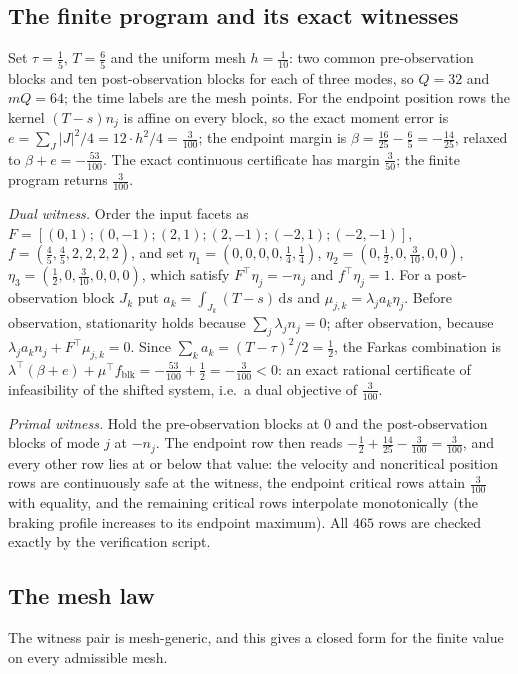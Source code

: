 \documentclass[11pt,a4paper]{article}
\theoremstyle{plain}
\theoremstyle{definition}
\theoremstyle{remark}
\newcommand{\tfr}[2]{\tfrac{#1}{#2}}
\newcommand{\dd}{\,\mathrm{d}}
\begin{document}
\subsection{The finite program and its exact witnesses}

Set $\tau=\tfr15$, $T=\tfr65$ and the uniform mesh $h=\tfr1{10}$: two common pre-observation blocks and ten post-observation blocks for each of three modes, so $Q=32$ and $mQ=64$; the time labels are the mesh points. For the endpoint position rows the kernel $(T-s)n_j$ is affine on every block, so the exact moment error is $e=\sum_J|J|^2/4=12\cdot h^2/4=\tfr3{100}$; the endpoint margin is $\beta=\tfr{16}{25}-\tfr65=-\tfr{14}{25}$, relaxed to $\beta+e=-\tfr{53}{100}$. The exact continuous certificate has margin $\tfr3{50}$; the finite program returns $\tfr3{100}$.

\emph{Dual witness.} Order the input facets as $F=[(0,1);(0,-1);(2,1);(2,-1);(-2,1);(-2,-1)]$, $f=(\tfr45,\tfr45,2,2,2,2)$, and set $\eta_1=(0,0,0,0,\tfr14,\tfr14)$, $\eta_2=(0,\tfr12,0,\tfr3{10},0,0)$, $\eta_3=(\tfr12,0,\tfr3{10},0,0,0)$, which satisfy $F^\top\eta_j=-n_j$ and $f^\top\eta_j=1$. For a post-observation block $J_k$ put $a_k=\int_{J_k}(T-s)\dd s$ and $\mu_{j,k}=\lambda_ja_k\eta_j$. Before observation, stationarity holds because $\sum_j\lambda_jn_j=0$; after observation, because $\lambda_ja_kn_j+F^\top\mu_{j,k}=0$. Since $\sum_ka_k=(T-\tau)^2/2=\tfr12$, the Farkas combination is $\lambda^\top(\beta+e)+\mu^\top f_{\mathrm{blk}}=-\tfr{53}{100}+\tfr12=-\tfr3{100}<0$: an exact rational certificate of infeasibility of the shifted system, i.e.\ a dual objective of $\tfr3{100}$.

\emph{Primal witness.} Hold the pre-observation blocks at $0$ and the post-observation blocks of mode $j$ at $-n_j$. The endpoint row then reads $-\tfr12+\tfr{14}{25}-\tfr3{100}=\tfr3{100}$, and every other row lies at or below that value: the velocity and noncritical position rows are continuously safe at the witness, the endpoint critical rows attain $\tfr3{100}$ with equality, and the remaining critical rows interpolate monotonically (the braking profile increases to its endpoint maximum). All $465$ rows are checked exactly by the verification script.

\subsection{The mesh law}

The witness pair is mesh-generic, and this gives a closed form for the finite value on every admissible mesh.
\end{document}

